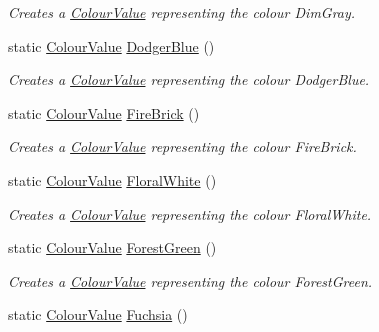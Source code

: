 \begin{DoxyCompactItemize}
\begin{DoxyCompactList}\small\item\em Creates a \hyperlink{classMezzanine_1_1ColourValue}{ColourValue} representing the colour DimGray. \item\end{DoxyCompactList}\item 
static \hyperlink{classMezzanine_1_1ColourValue}{ColourValue} \hyperlink{classMezzanine_1_1ColourValue_aa3e5241c6b54e3fc50dcad0c4b5b87fc}{DodgerBlue} ()
\begin{DoxyCompactList}\small\item\em Creates a \hyperlink{classMezzanine_1_1ColourValue}{ColourValue} representing the colour DodgerBlue. \item\end{DoxyCompactList}\item 
static \hyperlink{classMezzanine_1_1ColourValue}{ColourValue} \hyperlink{classMezzanine_1_1ColourValue_a129c8784e6fdf4832c0ab023e1a33f32}{FireBrick} ()
\begin{DoxyCompactList}\small\item\em Creates a \hyperlink{classMezzanine_1_1ColourValue}{ColourValue} representing the colour FireBrick. \item\end{DoxyCompactList}\item 
static \hyperlink{classMezzanine_1_1ColourValue}{ColourValue} \hyperlink{classMezzanine_1_1ColourValue_a715127af9fc9be2ab12d6ca8b3f4018e}{FloralWhite} ()
\begin{DoxyCompactList}\small\item\em Creates a \hyperlink{classMezzanine_1_1ColourValue}{ColourValue} representing the colour FloralWhite. \item\end{DoxyCompactList}\item 
static \hyperlink{classMezzanine_1_1ColourValue}{ColourValue} \hyperlink{classMezzanine_1_1ColourValue_a7e2ad7146516048c995c2602385e6f1e}{ForestGreen} ()
\begin{DoxyCompactList}\small\item\em Creates a \hyperlink{classMezzanine_1_1ColourValue}{ColourValue} representing the colour ForestGreen. \item\end{DoxyCompactList}\item 
static \hyperlink{classMezzanine_1_1ColourValue}{ColourValue} \hyperlink{classMezzanine_1_1ColourValue_a3cc8a8ebdd2c53c943e24fbba2e21a4d}{Fuchsia} ()

\end{DoxyCompactItemize}
